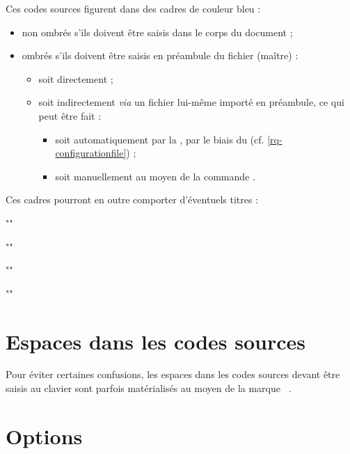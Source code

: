 Ces codes sources figurent dans des cadres de couleur bleu :
\begin{itemize}
\item non ombrés s'ils doivent être saisis dans le corps du document ;
\item ombrés s'ils doivent être saisis en préambule du fichier (maître) :
  \begin{itemize}
  \item soit directement ;
  \item soit indirectement \emph{via} un fichier lui-même importé en
    préambule, ce qui peut être fait :
    \begin{itemize}
    \item soit automatiquement par la \yatCl{}, par le biais du
      \File{\configurationfile} (cf. \vref{rq-configurationfile}) ;
    \item soit manuellement au moyen de la commande .
    \end{itemize}
  \end{itemize}
\end{itemize}
Ces cadres pourront en outre comporter d'éventuels titres :
\begin{multicols}{2}
\begin{bodycode}
""
\end{bodycode}
\begin{bodycode}[title=\meta{titre}]
""
\end{bodycode}
\begin{preamblecode}
""
\end{preamblecode}
\begin{preamblecode}[title=\meta{titre}]
""
\end{preamblecode}
\end{multicols}

\section{Espaces dans les codes sources}
\label{sec-espaces-dans-les}
%

Pour éviter certaines confusions, les espaces dans les codes sources devant
être saisis au clavier sont parfois matérialisés au moyen de la marque
\lstinline[showspaces]+ +.

\section{Options}
\label{sec-options}
%

